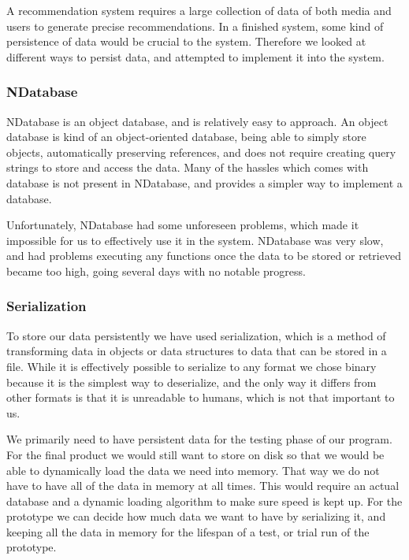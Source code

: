 A recommendation system requires a large collection of data of both media and users to generate precise recommendations. In a finished system, some kind of persistence of data would be crucial to the system. Therefore we looked at different ways to persist data, and attempted to implement it into the system.

\subsubsection{NDatabase}

NDatabase is an object database, and is relatively easy to approach. An object database is kind of an object-oriented database, being able to simply store objects, automatically preserving references, and does not require creating query strings to store and access the data. Many of the hassles which comes with database is not present in NDatabase, and provides a simpler way to implement a database. \cite{NDatabase}

Unfortunately, NDatabase had some unforeseen problems, which made it impossible for us to effectively use it in the system. NDatabase was very slow, and had problems executing any functions once the data to be stored or retrieved became too high, going several days with no notable progress.

\subsubsection{Serialization}

To store our data persistently we have used serialization, which is a method of transforming data in objects or data structures to data that can be stored in a file\cite{Serialization}. While it is effectively possible to serialize to any format we chose binary because it is the simplest way to deserialize, and the only way it differs from other formats is that it is unreadable to humans, which is not that important to us. 

We primarily need to have persistent data for the testing phase of our program. For the final product we would still want to store on disk so that we would be able to dynamically load the data we need into memory. That way we do not have to have all of the data in memory at all times. This would require an actual database and a dynamic loading algorithm to make sure speed is kept up. For the prototype we can decide how much data we want to have by serializing it, and keeping all the data in memory for the lifespan of a test, or trial run of the prototype.